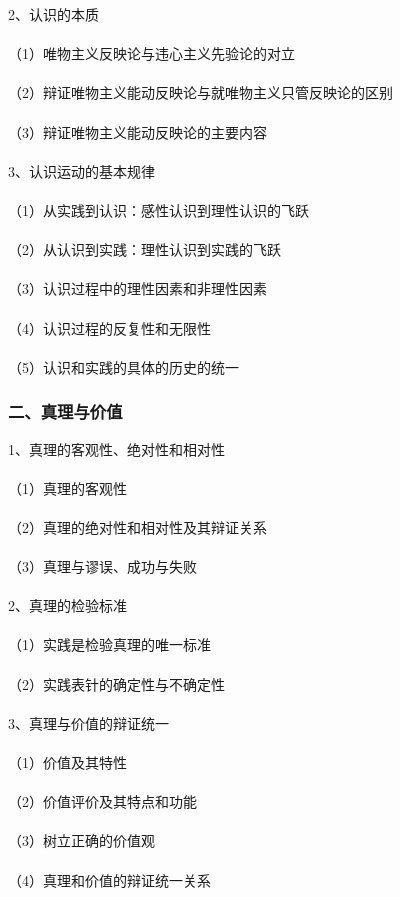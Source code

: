 \documentclass{ctexart}
\begin{document}
2、认识的本质
\\\\
（1）唯物主义反映论与违心主义先验论的对立
\\\\
（2）辩证唯物主义能动反映论与就唯物主义只管反映论的区别
\\\\
（3）辩证唯物主义能动反映论的主要内容
\\\\

3、认识运动的基本规律
\\\\
（1）从实践到认识：感性认识到理性认识的飞跃
\\\\
（2）从认识到实践：理性认识到实践的飞跃
\\\\
（3）认识过程中的理性因素和非理性因素
\\\\
（4）认识过程的反复性和无限性
\\\\
（5）认识和实践的具体的历史的统一
\subsubsection{二、真理与价值}
1、真理的客观性、绝对性和相对性
\\\\
（1）真理的客观性
\\\\
（2）真理的绝对性和相对性及其辩证关系
\\\\
（3）真理与谬误、成功与失败
\\\\

2、真理的检验标准
\\\\
（1）实践是检验真理的唯一标准
\\\\
（2）实践表针的确定性与不确定性
\\\\

3、真理与价值的辩证统一
\\\\
（1）价值及其特性
\\\\
（2）价值评价及其特点和功能
\\\\
（3）树立正确的价值观
\\\\
（4）真理和价值的辩证统一关系
\end{document}
